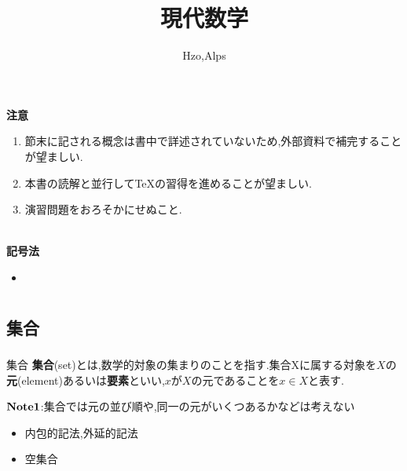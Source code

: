 \documentclass[dvipdfmx,b4j]{jsarticle}
\begin{document}
\title{現代数学}
\author{Hzo,Alps}
\maketitle

\begin{framed}
\textbf{注意}
\begin{enumerate}
    \item 節末に記される概念は書中で詳述されていないため,外部資料で補完することが望ましい.
    \item 本書の読解と並行して\TeX の習得を進めることが望ましい.
    \item 演習問題をおろそかにせぬこと.
\end{enumerate}
\end{framed}
\tableofcontents
\noindent\hrulefill\\
\noindent\textbf{記号法}
\begin{itemize}
  \item 
\end{itemize}
\section{}

\subsection{集合}
\subsubsection{}
\begin{definition}{集合}{}
\textbf{集合}(set)とは,数学的対象の集まりのことを指す.集合Xに属する対象を$X$の\textbf{元}(element)あるいは\textbf{要素}といい,$x$が$X$の元であることを$x\in X$と表す.
\end{definition}
\noindent $\bf{Note1}$:集合では元の並び順や,同一の元がいくつあるかなどは考えない
\begin{itemize}
\item 内包的記法,外延的記法
\item 空集合
\end{itemize}
\end{document}
